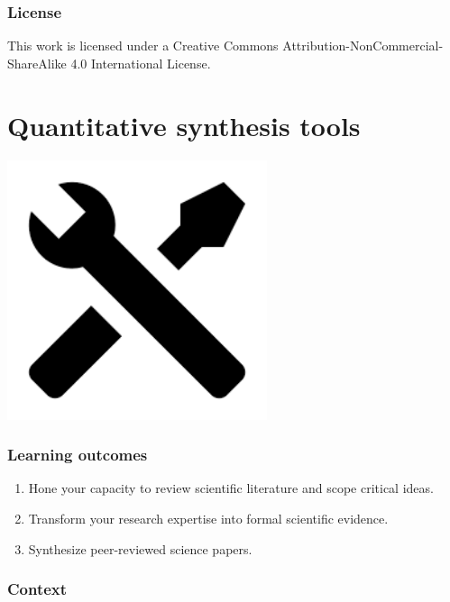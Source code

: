 \documentclass[
]{book}
\providecommand{\tightlist}{%
  \setlength{\itemsep}{0pt}\setlength{\parskip}{0pt}}
\begin{document}
\hypertarget{license}{%
\subsection*{License}\label{license}}

This work is licensed under a Creative Commons Attribution-NonCommercial-ShareAlike 4.0 International License.

\hypertarget{tools}{%
\chapter{Quantitative synthesis tools}\label{tools}}

\includegraphics[width=3in,height=\textheight]{./tools.png}

\hypertarget{learning-outcomes-1}{%
\subsection*{Learning outcomes}\label{learning-outcomes-1}}

\begin{enumerate}
\def\labelenumi{\arabic{enumi}.}
\tightlist
\item
  Hone your capacity to review scientific literature and scope critical ideas.
\item
  Transform your research expertise into formal scientific evidence.\\
\item
  Synthesize peer-reviewed science papers.
\end{enumerate}

\hypertarget{context}{%
\subsection*{Context}\label{context}}
\end{document}
